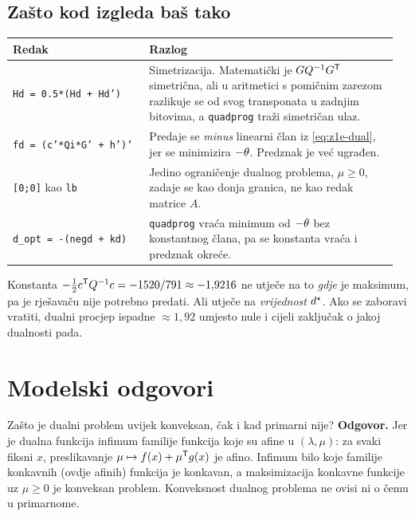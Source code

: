 \subsection{Zašto kod izgleda baš tako}

\begin{longtable}{@{}p{0.34\linewidth} p{0.62\linewidth}@{}}
\toprule
\textbf{Redak} & \textbf{Razlog} \\
\midrule
\endhead
\texttt{Hd = 0.5*(Hd + Hd')} & Simetrizacija. Matematički je $GQ^{-1}G^{\mathsf{T}}$
simetrična, ali u aritmetici s pomičnim zarezom razlikuje se od svog transponata
u zadnjim bitovima, a \texttt{quadprog} traži simetričan ulaz. \\[5pt]
\texttt{fd = (c'*Qi*G' + h')'} & Predaje se \emph{minus} linearni član iz
\eqref{eq:z1e-dual}, jer se minimizira $-\theta$. Predznak je već ugrađen. \\[5pt]
\texttt{[0;0]} kao \texttt{lb} & Jedino ograničenje dualnog problema, $\mu \geq 0$,
zadaje se kao donja granica, ne kao redak matrice $A$. \\[5pt]
\texttt{d\_opt = -(negd + kd)} & \texttt{quadprog} vraća minimum od $-\theta$ bez
konstantnog člana, pa se konstanta vraća i predznak okreće. \\
\bottomrule
\end{longtable}

\begin{zamka}
Konstanta $-\tfrac12 c^{\mathsf{T}} Q^{-1}c = -1520/791 \approx -1{,}9216$ ne utječe na
to \emph{gdje} je maksimum, pa je rješavaču nije potrebno predati. Ali utječe na
\emph{vrijednost} $d^{\star}$. Ako se zaboravi vratiti, dualni procjep ispadne
$\approx 1{,}92$ umjesto nule i cijeli zaključak o jakoj dualnosti pada.
\end{zamka}

\section{Modelski odgovori}
\label{sec:z1e-odgovori}

\begin{pitanje}{Zašto je dualni problem uvijek konveksan, čak i kad primarni nije?}
\textbf{Odgovor.} Jer je dualna funkcija infimum familije funkcija koje su afine
u $(\lambda,\mu)$: za svaki fiksni $x$, preslikavanje
$\mu \mapsto f(x) + \mu^{\mathsf{T}} g(x)$ je afino. Infimum bilo koje familije
konkavnih (ovdje afinih) funkcija je konkavan, a maksimizacija konkavne funkcije
uz $\mu \geq 0$ je konveksan problem. Konveksnost dualnog problema ne ovisi ni o
čemu u primarnome.
\end{pitanje}

